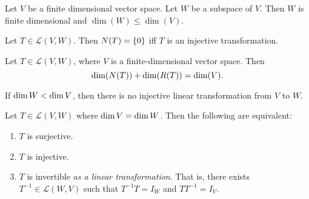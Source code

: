 \documentclass[12pt]{article}
\begin{document}
\begin{prop}[] \label{prop:}
    Let $V$ be a finite dimensional vector space.
    Let $W$ be a subspace of $V$.
    Then $W$ is finite dimensional and $\dim(W) \leq \dim(V)$.
\end{prop}

\begin{prop}[] \label{prop:}
    Let $T \in \mathscr{L}(V, W)$. Then $N(T) = \set{0}$ iff $T$ is an injective transformation.
\end{prop}

\begin{thm} \label{thm:rank nullity}
    Let $T \in \mathscr{L}(V, W)$, where $V$ is a finite-dimensional vector space. Then \[
        \operatorname{dim}(N(T)) + \operatorname{dim}(R(T)) = \operatorname{dim}(V).
    \]
\end{thm}

\begin{cor}[] \label{cor:}
    If $\operatorname{dim} W < \operatorname{dim} V$, then there is no injective linear transformation from $V$ to $W$.
\end{cor}

\begin{cor}[] \label{cor:}
    Let $T \in \mathscr{L}(V, W)$ where $\operatorname{dim} V = \operatorname{dim} W$. Then the following are equivalent:
    \begin{enumerate}[label=(\alph*)]
        \item $T$ is surjective.
        \item $T$ is injective.
        \item $T$ is invertible \emph{as a linear transformation}. That is, there exists $T^{-1} \in \mathscr{L}(W, V)$ such that $T^{-1}T = I_{W}$ and $TT^{-1} = I_{V}$.
    \end{enumerate}
\end{cor}
\end{document}
